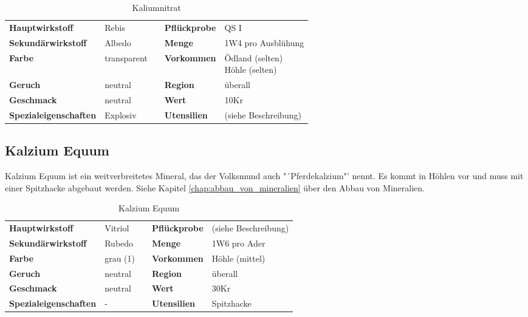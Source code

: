 \begin{table}[H] 
\begin{center} 
\begin{tabular}{|l|l|p{1cm}|l|l|} 
  	\cline{1-2} \cline{4-5} 
  	\textbf{Hauptwirkstoff} & Rebis && \textbf{Pflückprobe} & QS I \\ \cline{1-2} \cline{4-5} 
  	\textbf{Sekundärwirkstoff} & Albedo && \textbf{Menge} & 1W4 pro Ausblühung \\ \cline{1-2} \cline{4-5} 
  	\textbf{Farbe} & transparent && \textbf{Vorkommen} & \brcell{Ödland (selten) \\ Höhle (selten)} \\ \cline{1-2} \cline{4-5} 
  	\textbf{Geruch} & neutral && \textbf{Region} & überall \\ \cline{1-2} \cline{4-5} 
  	\textbf{Geschmack} & neutral && \textbf{Wert} & 10Kr \\ \cline{1-2} \cline{4-5} 
  	\textbf{Spezialeigenschaften} & Explosiv && \textbf{Utensilien} & (siehe Beschreibung) \\ \cline{1-2} \cline{4-5} 
\end{tabular} 
\end{center} 
\caption{Kaliumnitrat} 
\label{tab:kaliumnitrat} 
\end{table}


\subsection{Kalzium Equum}
Kalzium Equum ist ein weitverbreitetes Mineral, das der Volksmund auch "´Pferdekalzium"' nennt. Es kommt in Höhlen vor und muss mit einer Spitzhacke abgebaut werden. Siehe Kapitel \ref{chap:abbau_von_mineralien} über den Abbau von Mineralien.

\begin{table}[H] 
\begin{center} 
\begin{tabular}{|l|l|p{1cm}|l|l|} 
  	\cline{1-2} \cline{4-5} 
  	\textbf{Hauptwirkstoff} & Vitriol && \textbf{Pflückprobe} & (siehe Beschreibung) \\ \cline{1-2} \cline{4-5} 
  	\textbf{Sekundärwirkstoff} & Rubedo && \textbf{Menge} & 1W6 pro Ader \\ \cline{1-2} \cline{4-5} 
  	\textbf{Farbe} & grau (1) && \textbf{Vorkommen} & Höhle (mittel) \\ \cline{1-2} \cline{4-5} 
  	\textbf{Geruch} & neutral && \textbf{Region} & überall \\ \cline{1-2} \cline{4-5} 
  	\textbf{Geschmack} & neutral && \textbf{Wert} & 30Kr \\ \cline{1-2} \cline{4-5} 
  	\textbf{Spezialeigenschaften} & - && \textbf{Utensilien} & Spitzhacke \\ \cline{1-2} \cline{4-5} 
\end{tabular} 
\end{center} 
\caption{Kalzium Equum} 
\label{tab:kalzium_equum} 
\end{table}


